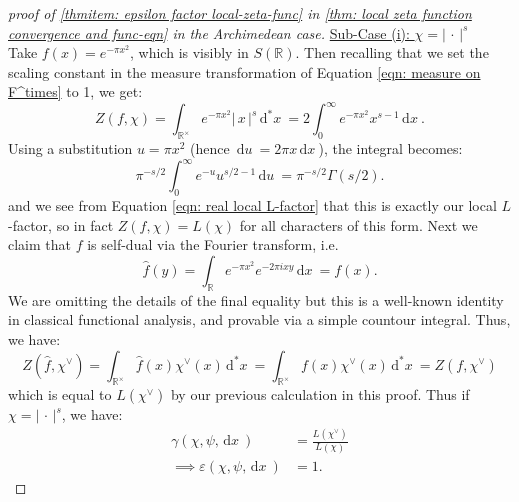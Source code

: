 \documentclass[11pt, x11names]{book}
\newcommand{\rr}{\mathbb{R}}
\newcommand{\abs}[1]{\left| \, #1  \,\right|}
\renewcommand{\hat}{\widehat}
\newcommand{\du}{\, \mathrm{d}u \ }
\newcommand{\dx}{\, \mathrm{d}x \ }
\renewcommand{\d}[1]{\, \mathrm{d}#1 \ }
\begin{document}
\begin{proof}[proof of \ref{thmitem: epsilon factor local-zeta-func} in \ref{thm: local zeta function convergence and func-eqn} in the Archimedean case]
\underline{Sub-Case (i): $\chi = \abs{\cdot}^s$}\\
Take $f(x) = e^{- \pi x^2}$, which is visibly in $S(\rr)$. Then recalling that we set the scaling constant in the measure transformation of Equation \ref{eqn: measure on F^times} to 1, we get:
\begin{equation*}
    Z(f, \chi) = \int_{\rr^\times} e^{-\pi x^2} \abs{x}^s \d{^*x} = 2 \int^\infty_0 e^{-\pi x^2} x^{s-1} \dx.
\end{equation*}
Using a substitution $u = \pi x^2$ (hence $\du = 2 \pi x \dx$),  the integral becomes:
\begin{equation*}
    \pi^{-s/2} \int^\infty_0 e^{-u} u^{s/2 - 1} \du = \pi^{-s/2} \Gamma(s/2).
\end{equation*}
and we see from Equation \ref{eqn: real local L-factor} that this is exactly our local $L$-factor, so in fact $Z(f, \chi) = L(\chi)$ for all characters of this form. Next we claim that $f$ is self-dual via the Fourier transform, i.e.
\begin{equation*}
    \hat{f}(y) = \int_\rr e^{-\pi x^2} e^{-2 \pi i xy} \dx = f(x).
\end{equation*}
We are omitting the details of the final equality but this is a well-known identity in classical functional analysis, and provable via a simple countour integral. Thus, we have:
\begin{equation*}
    Z(\hat{f}, \chi^\lor) = \int_{\rr^\times} \hat{f}(x) \chi^\lor(x) \d{^*x} = \int_{\rr^\times} f(x) \chi^\lor(x) \d{^*x} = Z(f, \chi^\lor)
\end{equation*}
which is equal to $L(\chi^\lor)$ by our previous calculation in this proof. Thus if $\chi = \abs{\cdot}^s$, we have:
\begin{align}
\label{eqn: real epsilon factor 1}
    \gamma(\chi, \psi, \dx) &= \frac{L(\chi^\lor)}{L(\chi)} \nonumber \\
    \implies \varepsilon(\chi, \psi, \dx) &= 1.
\end{align}


\end{proof}
\end{document}
